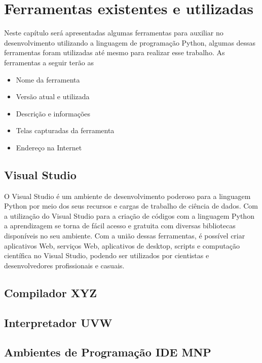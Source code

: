 

\chapter{Ferramentas existentes e utilizadas}
Neste capítulo será apresentadas algumas ferramentas para auxiliar no desenvolvimento utilizando a linguagem de programação Python, algumas dessas ferramentas foram utilizadas até mesmo para realizar esse trabalho. As ferramentas a seguir terão as \begin{itemize}
	\item Nome da ferramenta
	\item Versão atual e utilizada
	\item Descrição e informações
	\item Telas capturadas da ferramenta
	\item Endereço na Internet
\end{itemize}


    \section{Visual Studio }

O Visual Studio é um ambiente de desenvolvimento poderoso para a linguagem Python por meio dos seus recursos e cargas de trabalho de ciência de dados. Com a utilização do Visual Studio para a criação de códigos com a linguagem Python a aprendizagem se torna de fácil acesso e gratuita com diversas bibliotecas disponíveis no seu ambiente. Com a união dessas ferramentas, é possível criar aplicativos Web, serviços Web, aplicativos de desktop, scripts e computação científica no Visual Studio, podendo ser utilizados por cientistas e desenvolvedores profissionais e casuais.

    \section{Compilador XYZ}


    \section{Interpretador UVW}


    \section{Ambientes de Programa\c{c}\~{a}o IDE MNP} 